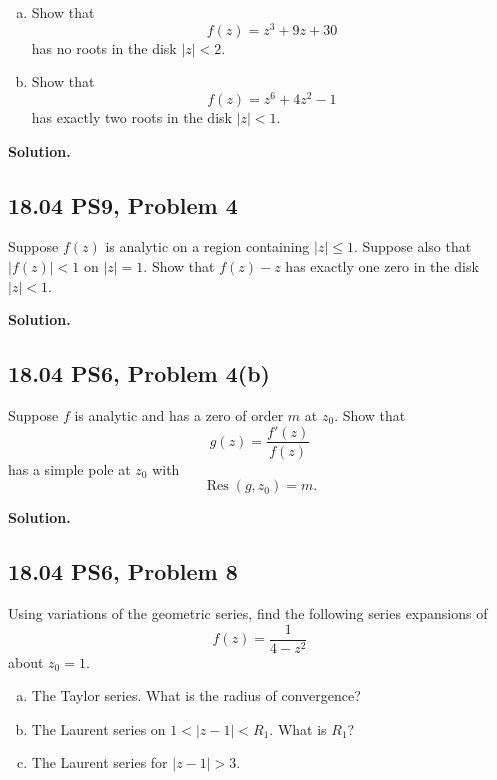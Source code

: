 \documentclass{article}
\newcommand{\Res}{\operatorname{Res}}
\newenvironment{solution}{%
  \par\medskip\noindent\textbf{Solution.}\par
}{\par\medskip}
\begin{document}
\begin{enumerate}[(a)]
  \item Show that
  \[
    f(z)=z^3+9z+30
  \]
  has no roots in the disk $|z|<2$.

  \item Show that
  \[
    f(z)=z^6+4z^2-1
  \]
  has exactly two roots in the disk $|z|<1$.
\end{enumerate}

\begin{solution}
\end{solution}

\subsection*{18.04 PS9, Problem 4}

Suppose $f(z)$ is analytic on a region containing $|z|\le 1$. Suppose also
that $|f(z)|<1$ on $|z|=1$. Show that $f(z)-z$ has exactly one zero in the
disk $|z|<1$.

\begin{solution}
\end{solution}

\subsection*{18.04 PS6, Problem 4(b)}

Suppose $f$ is analytic and has a zero of order $m$ at $z_0$. Show that
\[
  g(z)=\frac{f'(z)}{f(z)}
\]
has a simple pole at $z_0$ with
\[
  \Res(g,z_0)=m.
\]

\begin{solution}
\end{solution}

\subsection*{18.04 PS6, Problem 8}

Using variations of the geometric series, find the following series
expansions of
\[
  f(z)=\frac{1}{4-z^2}
\]
about $z_0=1$.
\begin{enumerate}[(a)]
  \item The Taylor series. What is the radius of convergence?

  \item The Laurent series on $1<|z-1|<R_1$. What is $R_1$?

  \item The Laurent series for $|z-1|>3$.
\end{enumerate}
\end{document}
